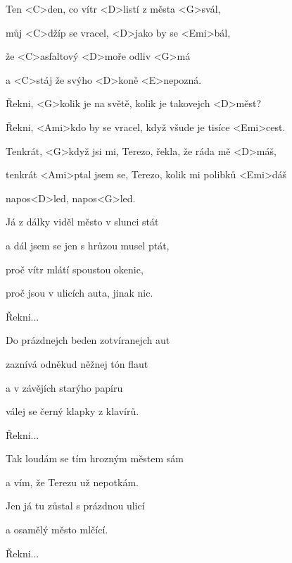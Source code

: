 

\zs
Ten <C>den, co vítr <D>listí z města <G>svál,

můj <C>džíp se vracel, <D>jako by se <Emi>bál,

že <C>asfaltový <D>moře odliv <G>má

a <C>stáj že svýho <D>koně <E>nepozná.
\ks

\zr
Řekni, <G>kolik je na světě, kolik je takovejch <D>měst?

Řekni, <Ami>kdo by se vracel, když všude je tisíce <Emi>cest.

Tenkrát, <G>když jsi mi, Terezo, řekla, že ráda mě <D>máš,

tenkrát <Ami>ptal jsem se, Terezo, kolik mi polibků <Emi>dáš

napos<D>led, napos<G>led.
\kr

\zs
Já z dálky viděl město v slunci stát

a dál jsem se jen s hrůzou musel ptát,

proč vítr mlátí spoustou okenic,

proč jsou v ulicích auta, jinak nic.
\ks

\zr
Řekni...
\kr

\zs
Do prázdnejch beden zotvíranejch aut

zaznívá odněkud něžnej tón flaut

a v závějích starýho papíru

válej se černý klapky z klavírů.
\ks

\zr
Řekni...
\kr

\zs
Tak loudám se tím hrozným městem sám

a vím, že Terezu už nepotkám.

Jen já tu zůstal s prázdnou ulicí

a osamělý město mlčící.
\ks

\zr
Řekni...
\kr

\kp
